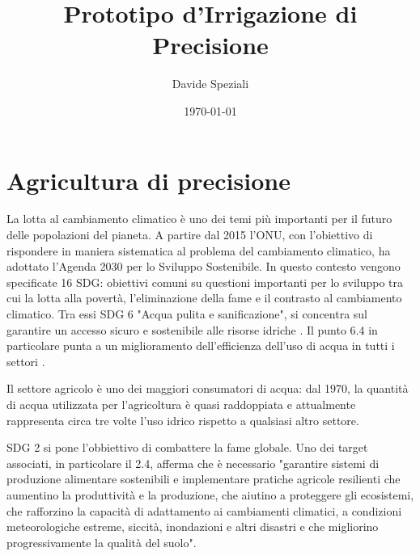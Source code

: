 \documentclass[12pt,a4paper,openright,twoside]{book}
\title{Prototipo d'Irrigazione di Precisione}
\author{Davide Speziali}
\date{\today}
\begin{document}
\frontmatter\frontispiece
%

%
\tableofcontents
\listoffigures     %

\mainmatter
%
%
\chapter{Agricultura di precisione}
%
La lotta al cambiamento climatico è uno dei temi più importanti per il futuro delle popolazioni del pianeta.
A partire dal 2015 l'\ac{ONU}, con l'obiettivo di rispondere in maniera sistematica al problema del cambiamento climatico, ha adottato l'Agenda 2030 per lo Sviluppo Sostenibile.
In questo contesto vengono specificate 16 \ac{SDG}: obiettivi comuni su questioni importanti per lo sviluppo tra cui la lotta alla povertà, l'eliminazione della fame e il contrasto al cambiamento climatico. Tra essi \ac{SDG} 6 "Acqua pulita e sanificazione", si concentra sul garantire un accesso sicuro e sostenibile alle risorse idriche \cite{SDG-6}. Il punto 6.4 in particolare punta a un miglioramento dell'efficienza dell'uso di acqua in tutti i settori \cite{SDG-6-4-1,UN-WATER-WATER-USE-EFF-21}.

Il settore agricolo è uno dei maggiori consumatori di acqua: dal 1970, la quantità di acqua utilizzata per l'agricoltura è quasi raddoppiata e attualmente rappresenta circa tre volte l'uso idrico rispetto a qualsiasi altro settore\cite{FAO-AQUASTAT-2020}.

\ac{SDG} 2 si pone l'obbiettivo di combattere la fame globale. Uno dei target associati, in particolare il 2.4, afferma che è necessario "garantire sistemi di produzione alimentare sostenibili e implementare pratiche agricole resilienti che aumentino la produttività e la produzione, che aiutino a proteggere gli ecosistemi, che rafforzino la capacità di adattamento ai cambiamenti climatici, a condizioni meteorologiche estreme, siccità, inondazioni e altri disastri e che migliorino progressivamente la qualità del suolo"\cite{SDG-2.4}.
\end{document}
